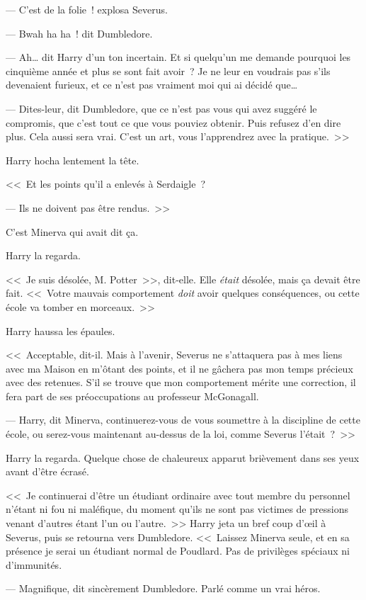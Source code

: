 --- C'est de la folie~! explosa Severus.

--- Bwah ha ha~! dit Dumbledore.

--- Ah… dit Harry d'un ton incertain. Et si quelqu'un me demande pourquoi les cinquième année et plus se sont fait avoir~? Je ne leur en voudrais pas s'ils devenaient furieux, et ce n'est pas vraiment moi qui ai décidé que…

--- Dites-leur, dit Dumbledore, que ce n'est pas vous qui avez suggéré le compromis, que c'est tout ce que vous pouviez obtenir. Puis refusez d'en dire plus. Cela aussi sera vrai. C'est un art, vous l'apprendrez avec la pratique.~>>

Harry hocha lentement la tête.

<<~Et les points qu'il a enlevés à Serdaigle~?

--- Ils ne doivent pas être rendus.~>>

C'est Minerva qui avait dit ça.

Harry la regarda.

<<~Je suis désolée, M. Potter~>>, dit-elle. Elle \emph{était} désolée, mais ça devait être fait. <<~Votre mauvais comportement \emph{doit} avoir quelques conséquences, ou cette école va tomber en morceaux.~>>

Harry haussa les épaules.

<<~Acceptable, dit-il. Mais à l'avenir, Severus ne s'attaquera pas à mes liens avec ma Maison en m'ôtant des points, et il ne gâchera pas mon temps précieux avec des retenues. S'il se trouve que mon comportement mérite une correction, il fera part de ses préoccupations au professeur McGonagall.

--- Harry, dit Minerva, continuerez-vous de vous soumettre à la discipline de cette école, ou serez-vous maintenant au-dessus de la loi, comme Severus l'était~?~>>

Harry la regarda. Quelque chose de chaleureux apparut brièvement dans ses yeux avant d'être écrasé.

<<~Je continuerai d'être un étudiant ordinaire avec tout membre du personnel n'étant ni fou ni maléfique, du moment qu'ils ne sont pas victimes de pressions venant d'autres étant l'un ou l'autre.~>> Harry jeta un bref coup d'œil à Severus, puis se retourna vers Dumbledore. <<~Laissez Minerva seule, et en sa présence je serai un étudiant normal de Poudlard. Pas de privilèges spéciaux ni d'immunités.

--- Magnifique, dit sincèrement Dumbledore. Parlé comme un vrai héros.

